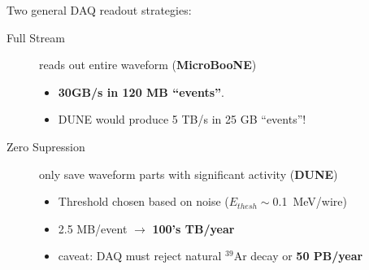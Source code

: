 \begin{frame}
  \footnotesize
  Two general DAQ readout strategies:
  \begin{description}
  \item[Full Stream] reads out entire waveform (\textbf{MicroBooNE})
    \begin{itemize}
    \item \textbf{30GB/s in 120 MB ``events''}.
    \item DUNE would produce 5 TB/s in 25 GB ``events''!
    \end{itemize}
  \item[Zero Supression] only save waveform parts with significant activity (\textbf{DUNE})
    \begin{itemize}
    \item Threshold chosen based on noise ($E_{thesh} \sim$\SI{0.1}{\mega\electronvolt}/wire)
    \item 2.5 MB/event $\rightarrow$ \textbf{100's TB/year}
    \item caveat: DAQ must reject natural $^{39}$Ar decay or \textbf{50 PB/year}
    \end{itemize}
  \end{description}

\end{frame}

